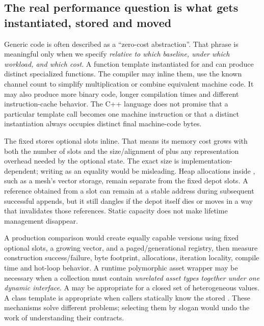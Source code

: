 \subsection{The real performance question is what gets instantiated, stored and moved}\label{05-engine-i-ch005-the-real-performance-question-is-what-gets-instantiated-stored-and-moved}

\hypertarget{05-engine-i-ch005-the-real-performance-question-is-what-gets-instantiated-stored-and-moved}{}

Generic code is often described as a ``zero-cost abstraction''. That phrase is meaningful only when we specify \emph{relative to which baseline, under which workload, and which cost}. A function template instantiated for  and  can produce distinct specialized functions. The compiler may inline them, use the known channel count to simplify multiplication or combine equivalent machine code. It may also produce more binary code, longer compilation times and different instruction-cache behavior. The C++ language does not promise that a particular template call becomes one machine instruction or that a distinct instantiation always occupies distinct final machine-code bytes.

The fixed  stores  optional slots inline. That means its memory cost grows with both the number of slots and the size/alignment of  plus any representation overhead needed by the optional state. The exact size is implementation-dependent; writing  as an equality would be misleading. Heap allocations inside , such as a mesh's vector storage, remain separate from the fixed depot slots. A reference obtained from a slot can remain at a stable address during subsequent successful appends, but it still dangles if the depot itself dies or moves in a way that invalidates those references. Static capacity does not make lifetime management disappear.

A production comparison would create equally capable versions using fixed optional slots, a growing vector, and a paged/generational registry, then measure construction success/failure, byte footprint, allocations, iteration locality, compile time and hot-loop behavior. A runtime polymorphic asset wrapper may be necessary when a collection must contain \emph{unrelated asset types together under one dynamic interface}. A  may be appropriate for a closed set of heterogeneous values. A class template is appropriate when callers statically know the stored . These mechanisms solve different problems; selecting them by slogan would undo the work of understanding their contracts.

